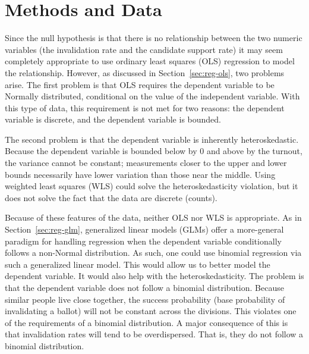 \section{Methods and Data}
Since the null hypothesis is that there is no relationship between the two numeric variables (the invalidation rate and the candidate support rate) it may seem completely appropriate to use ordinary least squares (OLS) regression to model the relationship. However, as discussed in Section~\ref{sec:reg-ols}, two problems arise. The first problem is that OLS requires the dependent variable to be Normally distributed, conditional on the value of the independent variable. With this type of data, this requirement is not met for two reasons: the dependent variable is discrete, and the dependent variable is bounded.

The second problem is that the dependent variable is inherently heteroskedastic.\cite{ekanem-forsberg-2018, kutner-nachtsheim-neter-2004, mebane-sekhon-2004} Because the dependent variable is bounded below by 0 and above by the turnout, the variance cannot be constant; measurements closer to the upper and lower bounds necessarily have lower variation than those near the middle. Using weighted least squares (WLS) could solve the heteroskedasticity violation, but it does not solve the fact that the data are discrete (counts).

Because of these features of the data, neither OLS nor WLS is appropriate. As in Section~\ref{sec:reg-glm}, generalized linear models (GLMs) offer a more-general paradigm for handling regression when the dependent variable conditionally follows a non-Normal distribution.\cite{mccullagh-nelder-2000,nelder-wedderburn-1972} As such, one could use binomial regression via such a generalized linear model. This would allow us to better model the dependent variable. It would also help with the heteroskedasticity. The problem is that the dependent variable does not follow a binomial distribution. Because similar people live close together, the success probability (base probability of invalidating a ballot) will not be constant across the divisions. This violates one of the requirements of a binomial distribution. A major consequence of this is that invalidation rates will tend to be overdispersed.\cite{ekanem-forsberg-2018, mebane-sekhon-2004, smith-2002} That is, they do not follow a binomial distribution.

